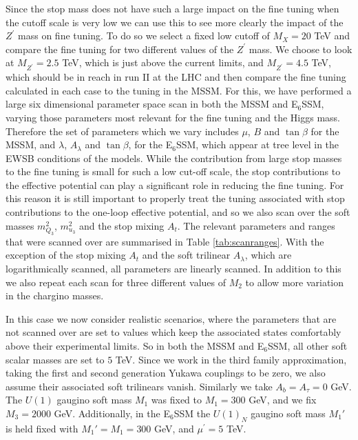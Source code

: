 \documentclass[preprint,amsmath,amssymb,aps,superscriptaddress,prd,showpacs,floatfix,nofootinbib]{revtex4-1}
\begin{document}
Since the stop mass does not have such a large impact on the fine
tuning when the cutoff scale is very low we can use this to see more
clearly the impact of the $Z^\prime$ mass on fine tuning. To do so we
select a fixed low cutoff of $M_X=20$ TeV and compare the fine tuning
for two different values of the $Z^\prime$ mass. We choose to look at
$M_{Z^\prime}=2.5$ TeV, which is just above the current limits, and
$M_{Z^\prime}=4.5$ TeV, which should be in reach in run II at the LHC
and then compare the fine tuning calculated in each case to the tuning
in the MSSM.  For this, we have performed a large six dimensional
parameter space scan in both the MSSM and E$_6$SSM, varying those
parameters most relevant for the fine tuning and the Higgs mass.
Therefore the set of parameters which we vary includes $\mu$, $B$ and
$\tan \beta$ for the MSSM, and $\lambda$, $A_\lambda$ and $\tan
\beta$, for the E$_6$SSM, which appear at tree level in the EWSB
conditions of the models. While the contribution from large stop
masses to the fine tuning is small for such a low cut-off scale, the
stop contributions to the effective potential can play a significant
role in reducing the fine tuning.  For this reason it is still
important to properly treat the tuning associated with stop
contributions to the one-loop effective potential, and so we also scan
over the soft masses $m_{Q_3}^2$, $m_{u_3}^2$ and the stop mixing
$A_t$.  The relevant parameters and ranges that were scanned over are
summarised in Table \ref{tab:scanranges}. With the exception of the
stop mixing $A_t$ and the soft trilinear $A_\lambda$, which are
logarithmically scanned, all parameters are linearly scanned.  In
addition to this we also repeat each scan for three different values
of $M_2$ to allow more variation in the chargino masses.

 In this case we now consider realistic scenarios, where the
 parameters that are not scanned over are set to values which keep the
 associated states comfortably above their experimental limits.  So in
 both the MSSM and E$_6$SSM, all other soft scalar masses are set
 to $5$ TeV.  Since we work in the third family approximation, taking
 the first and second generation Yukawa couplings to be zero, we also
 assume their associated soft trilinears vanish. Similarly we take
$A_b=A_\tau=0$ GeV. The $U(1)$ gaugino soft mass $M_1$ was fixed to
 $M_1=300$ GeV, and we fix $M_3=2000$ GeV. Additionally, in the
 E$_6$SSM the $U(1)_N$ gaugino soft mass $M_1'$ is held fixed with
 $M_1'=M_1=300$ GeV, and $\mu^\prime=5$ TeV.  
\end{document}
